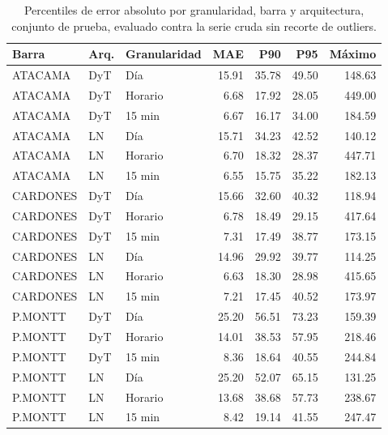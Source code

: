 \begin{table}[htbp]
    \centering
    \small
    \begin{tabular}{lllrrrr}
        \toprule
        Barra & Arq. & Granularidad & MAE & P90 & P95 & Máximo \\
        \midrule
        ATACAMA  & DyT & Día        & 15.91 & 35.78 & 49.50 & 148.63 \\
        ATACAMA  & DyT & Horario    & 6.68  & 17.92 & 28.05 & 449.00 \\
        ATACAMA  & DyT & 15 min     & 6.67  & 16.17 & 34.00 & 184.59 \\
        ATACAMA  & LN  & Día        & 15.71 & 34.23 & 42.52 & 140.12 \\
        ATACAMA  & LN  & Horario    & 6.70  & 18.32 & 28.37 & 447.71 \\
        ATACAMA  & LN  & 15 min     & 6.55  & 15.75 & 35.22 & 182.13 \\
        CARDONES & DyT & Día        & 15.66 & 32.60 & 40.32 & 118.94 \\
        CARDONES & DyT & Horario    & 6.78  & 18.49 & 29.15 & 417.64 \\
        CARDONES & DyT & 15 min     & 7.31  & 17.49 & 38.77 & 173.15 \\
        CARDONES & LN  & Día        & 14.96 & 29.92 & 39.77 & 114.25 \\
        CARDONES & LN  & Horario    & 6.63  & 18.30 & 28.98 & 415.65 \\
        CARDONES & LN  & 15 min     & 7.21  & 17.45 & 40.52 & 173.97 \\
        P.MONTT  & DyT & Día        & 25.20 & 56.51 & 73.23 & 159.39 \\
        P.MONTT  & DyT & Horario    & 14.01 & 38.53 & 57.95 & 218.46 \\
        P.MONTT  & DyT & 15 min     & 8.36  & 18.64 & 40.55 & 244.84 \\
        P.MONTT  & LN  & Día        & 25.20 & 52.07 & 65.15 & 131.25 \\
        P.MONTT  & LN  & Horario    & 13.68 & 38.68 & 57.73 & 238.67 \\
        P.MONTT  & LN  & 15 min     & 8.42  & 19.14 & 41.55 & 247.47 \\
        \bottomrule
    \end{tabular}
    \caption{Percentiles de error absoluto por granularidad, barra y arquitectura, conjunto de prueba, evaluado contra la serie cruda sin recorte de outliers.}
    \label{tab:granularidad_extremos}
\end{table}


